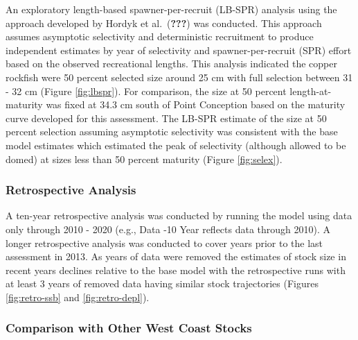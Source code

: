 \documentclass[11pt,
  english,
  a4paper,
]{article}
\begin{document}
An exploratory length-based spawner-per-recruit (LB-SPR) analysis using the approach developed by Hordyk et al.~{({\textbf{???}})\leavevmode\tagmcend\tagstructend} was conducted. This approach assumes asymptotic selectivity and deterministic recruitment to produce independent estimates by year of selectivity and spawner-per-recruit (SPR) effort based on the observed recreational lengths. This analysis indicated the copper rockfish were 50 percent selected size around 25 cm with full selection between 31 - 32 cm (Figure \ref{fig:lbspr}). For comparison, the size at 50 percent length-at-maturity was fixed at 34.3 cm south of Point Conception based on the maturity curve developed for this assessment. The LB-SPR estimate of the size at 50 percent selection assuming asymptotic selectivity was consistent with the base model estimates which estimated the peak of selectivity (although allowed to be domed) at sizes less than 50 percent maturity (Figure \ref{fig:selex}).

\leavevmode\tagmcend\tagstructend\par


\hypertarget{retrospective-analysis}{%
\subsubsection{Retrospective Analysis}\label{retrospective-analysis}}

\leavevmode\tagmcend\tagstructend


A ten-year retrospective analysis was conducted by running the model using data only through 2010 - 2020 (e.g., Data -10 Year reflects data through 2010). A longer retrospective analysis was conducted to cover years prior to the last assessment in 2013. As years of data were removed the estimates of stock size in recent years declines relative to the base model with the retrospective runs with at least 3 years of removed data having similar stock trajectories (Figures \ref{fig:retro-ssb} and \ref{fig:retro-depl}).

\leavevmode\tagmcend\tagstructend\par


\hypertarget{comparison-with-other-west-coast-stocks}{%
\subsubsection{Comparison with Other West Coast Stocks}\label{comparison-with-other-west-coast-stocks}}
\end{document}

